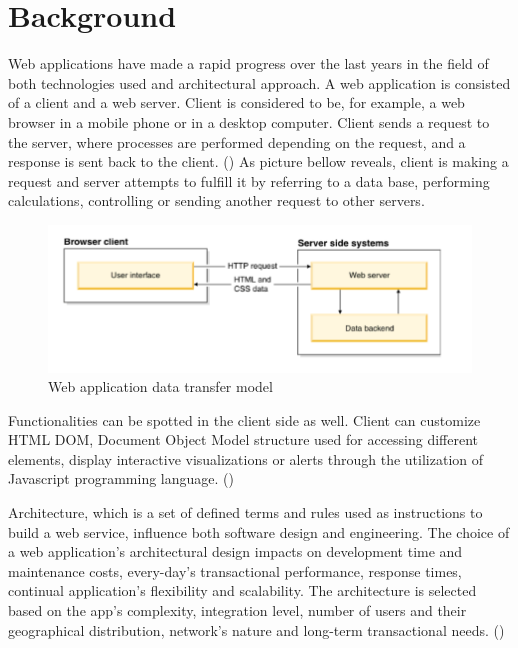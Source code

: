 
\chapter{Background} %

\label{Chapter2} %

Web applications have made a rapid progress over the last years in the field of both technologies used and architectural approach. A web application is consisted of a client and a web server. Client is considered to be, for example, a web browser in a mobile phone or in a desktop computer. Client sends a request to the server, where processes are performed depending on the request, and a response is sent back to the client. (\cite{Reference6}) As picture bellow reveals, client is making a request and server attempts to fulfill it by referring to a data base, performing calculations, controlling or sending another request to other servers. \par

\begin{figure}[h!]
	\begin{center}
		\includegraphics[scale=0.8]{images/web_structure.png}
	\end{center}
	\caption{Web application data transfer model}
\end{figure}

Functionalities can be spotted in the client side as well. Client can customize HTML DOM, Document Object Model structure used for accessing different elements, display interactive visualizations or alerts through the utilization of Javascript programming language. (\cite{Reference6}) \par

Architecture, which is a set of defined terms and rules used as instructions to build a web service, influence both software design and engineering. The choice of a web application's architectural design impacts on development time and maintenance costs, every-day's transactional performance, response times, continual application's flexibility and scalability. The architecture is selected based on the app's complexity, integration level, number of users and their geographical distribution, network's nature and long-term transactional needs. (\cite{Reference1})\par

